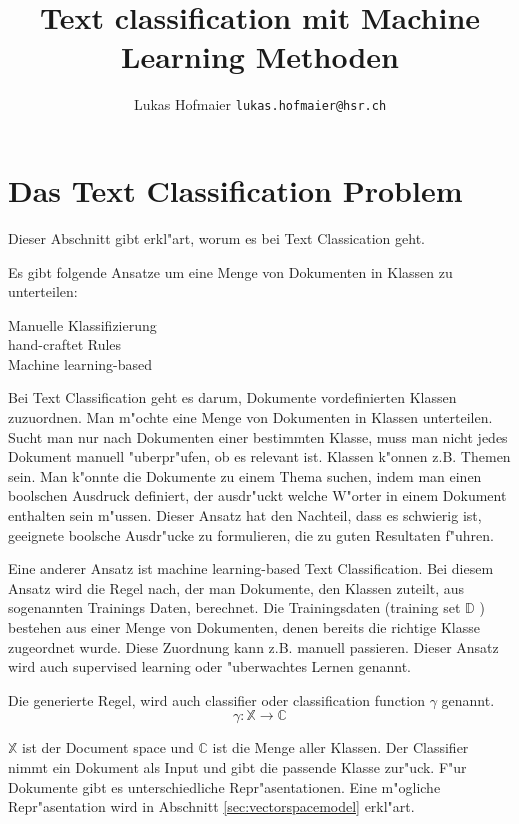 \documentclass[12pt,a4paper,twoside]{article}
\begin{document}
\title{Text classification mit Machine Learning Methoden}
\author{Lukas Hofmaier \texttt{lukas.hofmaier@hsr.ch}}
\maketitle

\section{Das Text Classification Problem}
\label{sec:problem}

Dieser Abschnitt gibt erkl"art, worum es bei Text Classication geht.

Es gibt folgende Ansatze um eine Menge von Dokumenten in Klassen zu unterteilen:
\begin{description}
\item[Manuelle Klassifizierung]
\item[hand-craftet Rules]
\item[Machine learning-based] 
\end{description}


Bei Text Classification geht es darum, Dokumente vordefinierten Klassen zuzuordnen. Man m"ochte eine Menge von Dokumenten in Klassen unterteilen. Sucht man nur nach Dokumenten einer bestimmten Klasse, muss man nicht jedes Dokument manuell "uberpr"ufen, ob es relevant ist. Klassen k"onnen z.B. Themen sein. Man k"onnte die Dokumente zu einem Thema suchen, indem man einen boolschen Ausdruck definiert, der ausdr"uckt welche W"orter in einem Dokument enthalten sein m"ussen. Dieser Ansatz hat den Nachteil, dass es schwierig ist, geeignete boolsche Ausdr"ucke zu formulieren, die zu guten Resultaten f"uhren.

Eine anderer Ansatz ist machine learning-based Text Classification. Bei diesem Ansatz wird die Regel nach, der man Dokumente, den Klassen zuteilt, aus sogenannten Trainings Daten, berechnet. Die Trainingsdaten (training set $\mathbb{D}$ ) bestehen aus einer Menge von Dokumenten, denen bereits die richtige Klasse zugeordnet wurde. Diese Zuordnung kann z.B. manuell passieren. Dieser Ansatz wird auch supervised learning oder "uberwachtes Lernen genannt. 

Die generierte Regel, wird auch classifier oder classification function $\gamma$ genannt.
\[
\gamma : \mathbb{X} \to \mathbb{C}
\]

$\mathbb{X}$ ist der Document space und $\mathbb{C}$ ist die Menge aller Klassen. Der Classifier nimmt ein Dokument als Input und gibt die passende Klasse zur"uck. F"ur Dokumente gibt es unterschiedliche Repr"asentationen. Eine m"ogliche Repr"asentation wird in Abschnitt \ref{sec:vectorspacemodel} erkl"art.
\end{document}
